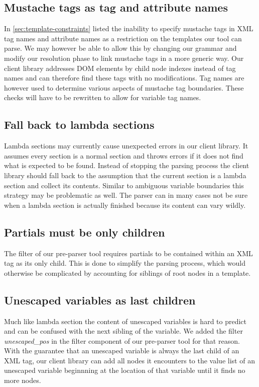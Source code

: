 \documentclass[thesis.tex]{subfiles}
\begin{document}
\subsection{Mustache tags as tag and attribute names}
In \ref{sec:template-constraints} listed the inability to specify mustache
tags in XML tag names and attribute names as a restriction on the templates our
tool can parse. We may however be able to allow this by changing our grammar and
modify our resolution phase to link mustache tags in a more generic way.
Our client library addresses DOM elements by child node indexes instead of tag
names and can therefore find these tags with no modifications. Tag names are
however used to determine various aspects of mustache tag boundaries. These
checks will have to be rewritten to allow for variable tag names.

\subsection{Fall back to lambda sections}
Lambda sections may currently cause unexpected errors in our client library.
It assumes every section is a normal section and throws errors if it does not
find what is expected to be found. Instead of stopping the parsing process
the client library should fall back to the assumption that the current section
is a lambda section and collect its contents. Similar to ambiguous variable
boundaries this strategy may be problematic as well. The parser can in many
cases not be sure when a lambda section is actually finished because its content
can vary wildly.

\subsection{Partials must be only children}
\label{sec:partial-only-child}
The filter of our pre-parser tool requires partials to be contained within an
XML tag as its only child. This is done to simplify the parsing process, which
would otherwise be complicated by accounting for siblings of root nodes in
a template.

\subsection{Unescaped variables as last children}
\label{sec:unescaped-variable-filter}
Much like lambda section the content of unescaped variables is hard to predict
and can be confused with the next sibling of the variable. We added the filter
\emph{unescaped\_pos} in the filter component of our pre-parser tool for that
reason. With the guarantee that an unescaped variable is always the last child
of an XML tag, our client library can add all nodes it encounters to the value
list of an unescaped variable beginnning at the location of that variable until
it finds no more nodes.
\end{document}
